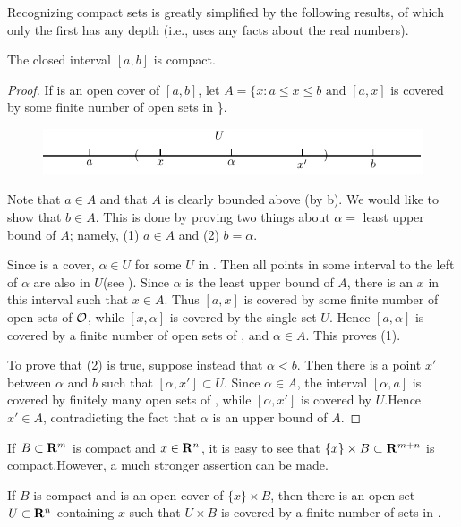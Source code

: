 Recognizing compact sets is greatly simplified by the following 
results, of which only the first has any depth (i.e., uses any
facts about the real numbers).

\begin{theorem}
    The closed interval $[a,b]$ is compact.
\end{theorem}

\begin{proof}
    If  is an open cover of $[a,b]$, let 
    $A = \{x:a\le x\le b\text{ and } [a, x]$ is covered by some finite number of open sets in \}.
    \begin{figure}[!htb]
        \centering
        \includegraphics[width=.75\linewidth]{./pics/Fig1-3.pdf}
        \caption{}
        \label{Fig 1-3}
    \end{figure}

    Note that $a\in A$ and that $A$ is clearly bounded above (by b).
    We would like to show that $b\in A$. This is done by proving two things about $\alpha =$ least 
    upper bound of $A$; namely, (1) $a\in A$ and (2) $b=\alpha$.

    Since  is a cover, $\alpha \in U$ for some $U$ in . Then all points in some interval 
    to the left of $\alpha$ are also in $U$(see ). Since $\alpha$ is the least upper bound 
    of $A$, there is an $x$ in this interval such that $x\in A$. Thus $[a, x]$ is covered by some 
    finite number of open sets of $\mathcal{O}$, while $[x, \alpha]$ is covered by the single set $U$. 
    Hence $[a, \alpha]$ is covered by a finite number of open sets of , and $\alpha \in A$.
    This proves (1).

    To prove that (2) is true, suppose instead that $\alpha < b$.
    Then there is a point $x'$ between $\alpha$ and $b$ such that $[\alpha,x'] \subset U$.
    Since $\alpha\in A$, the interval $[\alpha,a]$ is covered by finitely many
    open sets of , while $[\alpha, x']$ is covered by $U$.Hence $x' \in A$,
    contradicting the fact that $\alpha$ is an upper bound of $A$.
\end{proof}

If $B\subset \mathbf{R}^m$ is compact and $x \in \mathbf{R}^n$, it is easy to see that
$\{x\} \times B \subset \mathbf{R}^{m+n}$ is compact.However, a much stronger assertion can be made.
\begin{theorem}
    If $B$ is compact and  is an open cover of
    $\{x\} \times B$, then there is an open set $U \subset \mathbf{R}^n$ containing $x$ such
    that $U \times B$ is covered by a finite number of sets in .
\end{theorem}

